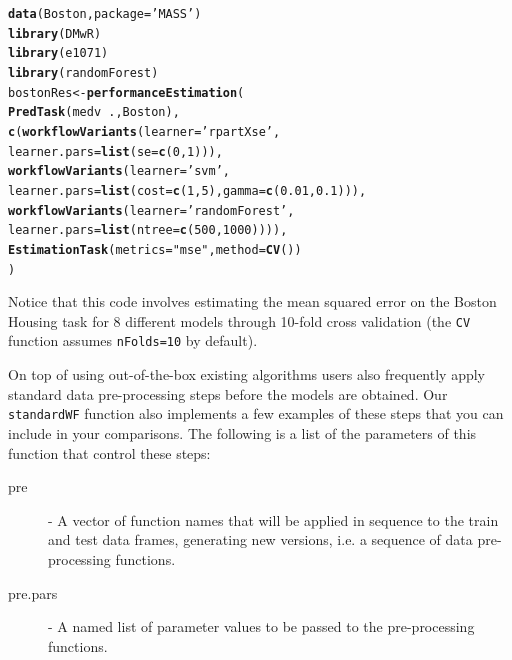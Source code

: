 \documentclass[10pt,a4paper]{article}\usepackage[]{graphicx}\usepackage[]{color}
\makeatletter
\newcommand{\hlnum}[1]{\textcolor[rgb]{0.686,0.059,0.569}{#1}}%
\newcommand{\hlstr}[1]{\textcolor[rgb]{0.192,0.494,0.8}{#1}}%
\newcommand{\hlopt}[1]{\textcolor[rgb]{0,0,0}{#1}}%
\newcommand{\hlstd}[1]{\textcolor[rgb]{0.345,0.345,0.345}{#1}}%
\newcommand{\hlkwb}[1]{\textcolor[rgb]{0.69,0.353,0.396}{#1}}%
\newcommand{\hlkwc}[1]{\textcolor[rgb]{0.333,0.667,0.333}{#1}}%
\newcommand{\hlkwd}[1]{\textcolor[rgb]{0.737,0.353,0.396}{\textbf{#1}}}%
\newenvironment{kframe}{%
 \def\at@end@of@kframe{}%
 \ifinner\ifhmode%
  \def\at@end@of@kframe{\end{minipage}}%
  \begin{minipage}{\columnwidth}%
 \fi\fi%
 \def\FrameCommand##1{\hskip\@totalleftmargin \hskip-\fboxsep
 \colorbox{shadecolor}{##1}\hskip-\fboxsep
     \hskip-\linewidth \hskip-\@totalleftmargin \hskip\columnwidth}%
 \MakeFramed {\advance\hsize-\width
   \@totalleftmargin\z@ \linewidth\hsize
   \@setminipage}}%
 {\par\unskip\endMakeFramed%
 \at@end@of@kframe}
\newenvironment{knitrout}{}{} %
\makeatother
\begin{document}
\begin{knitrout}\footnotesize
{}\color{fgcolor}\begin{kframe}
\begin{alltt}
\hlkwd{data}\hlstd{(Boston,}\hlkwc{package}\hlstd{=}\hlstr{'MASS'}\hlstd{)}
\hlkwd{library}\hlstd{(DMwR)}
\hlkwd{library}\hlstd{(e1071)}
\hlkwd{library}\hlstd{(randomForest)}
\hlstd{bostonRes} \hlkwb{<-} \hlkwd{performanceEstimation}\hlstd{(}
  \hlkwd{PredTask}\hlstd{(medv} \hlopt{~} \hlstd{.,Boston),}
  \hlkwd{c}\hlstd{(}\hlkwd{workflowVariants}\hlstd{(}\hlkwc{learner}\hlstd{=}\hlstr{'rpartXse'}\hlstd{,}
                     \hlkwc{learner.pars}\hlstd{=}\hlkwd{list}\hlstd{(}\hlkwc{se}\hlstd{=}\hlkwd{c}\hlstd{(}\hlnum{0}\hlstd{,}\hlnum{1}\hlstd{))),}
    \hlkwd{workflowVariants}\hlstd{(}\hlkwc{learner}\hlstd{=}\hlstr{'svm'}\hlstd{,}
                     \hlkwc{learner.pars}\hlstd{=}\hlkwd{list}\hlstd{(}\hlkwc{cost}\hlstd{=}\hlkwd{c}\hlstd{(}\hlnum{1}\hlstd{,}\hlnum{5}\hlstd{),}\hlkwc{gamma}\hlstd{=}\hlkwd{c}\hlstd{(}\hlnum{0.01}\hlstd{,}\hlnum{0.1}\hlstd{))),}
    \hlkwd{workflowVariants}\hlstd{(}\hlkwc{learner}\hlstd{=}\hlstr{'randomForest'}\hlstd{,}
                     \hlkwc{learner.pars}\hlstd{=}\hlkwd{list}\hlstd{(}\hlkwc{ntree}\hlstd{=}\hlkwd{c}\hlstd{(}\hlnum{500}\hlstd{,}\hlnum{1000}\hlstd{)))),}
  \hlkwd{EstimationTask}\hlstd{(}\hlkwc{metrics}\hlstd{=}\hlstr{"mse"}\hlstd{,}\hlkwc{method}\hlstd{=}\hlkwd{CV}\hlstd{())}
  \hlstd{)}
\end{alltt}
\end{kframe}
\end{knitrout}

Notice that this code involves estimating the mean squared error on the Boston Housing task for 8 different models through
10-fold cross validation (the \texttt{CV} function assumes \texttt{nFolds=10} by default).

On top of using out-of-the-box existing algorithms users also frequently apply standard data pre-processing steps before the models are obtained. Our \texttt{standardWF} function also implements a few examples of these steps that you can include in your comparisons. The following is a list of the parameters of this function that control these steps:

\begin{description}
\item[pre] - A vector of function names that will be applied in sequence to the train
  and test data frames, generating new versions, i.e. a sequence of data
  pre-processing functions.
\item[pre.pars] - A named list of parameter values to be passed to the pre-processing functions.
\end{description}
\end{document}

